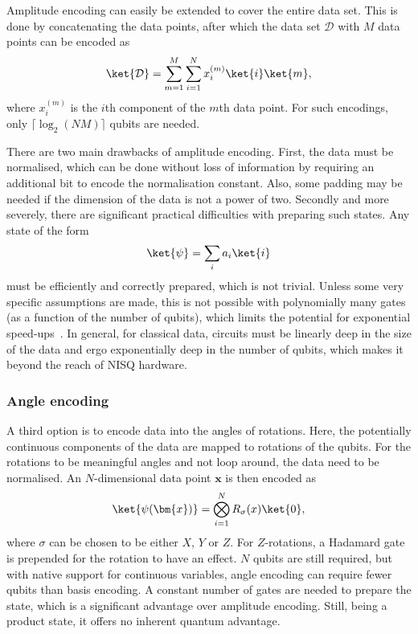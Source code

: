 Amplitude encoding can easily be extended to cover the entire data set.
This is done by concatenating the data points, after which the data set $\mathcal{D}$ with $M$ data points can be encoded as
\begin{equation}
  \ket{\mathcal{D}} = \sum_{m=1}^M \sum_{i=1}^{N} x_i^{(m)} \ket{i} \ket{m},
\end{equation}
where $x_i^{(m)}$ is the $i$th component of the $m$th data point.
For such encodings, only $\lceil \log_2 (N M) \rceil$ qubits are needed.

There are two main drawbacks of amplitude encoding.
First, the data must be normalised, which can be done without loss of information by requiring an additional bit to encode the normalisation constant.
Also, some padding may be needed if the dimension of the data is not a power of two.
Secondly and more severely, there are significant practical difficulties with preparing such states.
Any state of the form
\begin{equation}
  \ket{\psi} = \sum_{i} a_i \ket{i}
\end{equation}
must be efficiently and correctly prepared, which is not trivial.
Unless some very specific assumptions are made, this is not possible with polynomially many gates (as a function of the number of qubits), which limits the potential for exponential speed-ups~\autocite{schuld2018}.
In general, for classical data, circuits must be linearly deep in the size of the data and ergo exponentially deep in the number of qubits, which makes it beyond the reach of NISQ hardware.

\subsubsection{Angle encoding}
A third option is to encode data into the angles of rotations.
Here, the potentially continuous components of the data are mapped to rotations of the qubits.
For the rotations to be meaningful angles and not loop around, the data need to be normalised.
An $N$-dimensional data point $\bm{x}$ is then encoded as
\begin{equation}
  \ket{\psi(\bm{x})} = \bigotimes_{i=1}^{N} R_\sigma(x) \ket{0},
\end{equation}
where $\sigma$ can be chosen to be either $X$, $Y$ or $Z$.
For $Z$-rotations, a Hadamard gate is prepended for the rotation to have an effect.
$N$ qubits are still required, but with native support for continuous variables, angle encoding can require fewer qubits than basis encoding.
A constant number of gates are needed to prepare the state, which is a significant advantage over amplitude encoding.
Still, being a product state, it offers no inherent quantum advantage.

